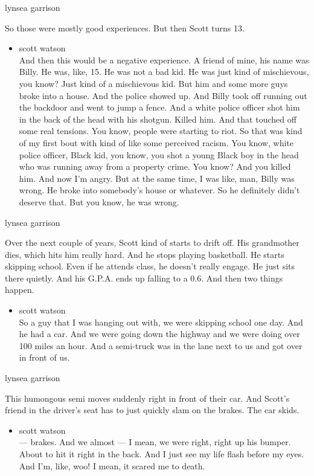 lynsea garrison

So those were mostly good experiences. But then Scott turns 13.

\begin{itemize}
\tightlist
\item
  scott watson\\
  And then this would be a negative experience. A friend of mine, his
  name was Billy. He was, like, 15. He was not a bad kid. He was just
  kind of mischievous, you know? Just kind of a mischievous kid. But him
  and some more guys broke into a house. And the police showed up. And
  Billy took off running out the backdoor and went to jump a fence. And
  a white police officer shot him in the back of the head with his
  shotgun. Killed him. And that touched off some real tensions. You
  know, people were starting to riot. So that was kind of my first bout
  with kind of like some perceived racism. You know, white police
  officer, Black kid, you know, you shot a young Black boy in the head
  who was running away from a property crime. You know? And you killed
  him. And now I'm angry. But at the same time, I was like, man, Billy
  was wrong. He broke into somebody's house or whatever. So he
  definitely didn't deserve that. But you know, he was wrong.
\end{itemize}

lynsea garrison

Over the next couple of years, Scott kind of starts to drift off. His
grandmother dies, which hits him really hard. And he stops playing
basketball. He starts skipping school. Even if he attends class, he
doesn't really engage. He just sits there quietly. And his G.P.A. ends
up falling to a 0.6. And then two things happen.

\begin{itemize}
\tightlist
\item
  scott watson\\
  So a guy that I was hanging out with, we were skipping school one day.
  And he had a car. And we were going down the highway and we were doing
  over 100 miles an hour. And a semi-truck was in the lane next to us
  and got over in front of us.
\end{itemize}

lynsea garrison

This humongous semi moves suddenly right in front of their car. And
Scott's friend in the driver's seat has to just quickly slam on the
brakes. The car skids.

\begin{itemize}
\tightlist
\item
  scott watson\\
  --- brakes. And we almost --- I mean, we were right, right up his
  bumper. About to hit it right in the back. And I just see my life
  flash before my eyes. And I'm, like, woo! I mean, it scared me to
  death.
\end{itemize}

